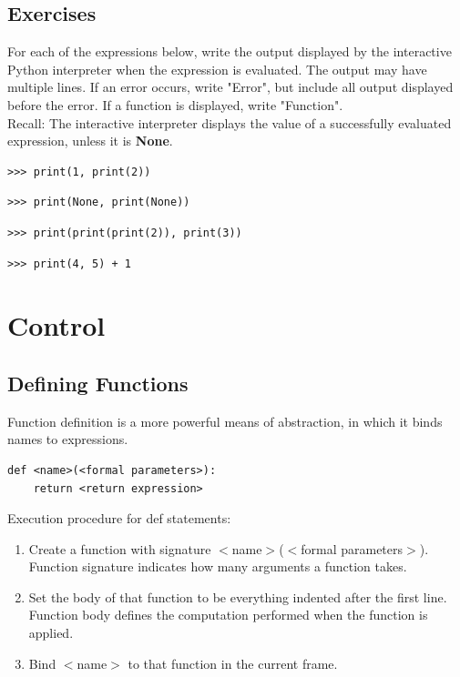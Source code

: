 \documentclass[11pt]{article}
\begin{document}
\subsection{Exercises}
For each of the expressions below, write the output displayed by the interactive Python interpreter when the expression is evaluated. The output may have multiple lines. If an error occurs, write "Error", but include all output displayed before the error. If a function is displayed, write "Function". \\
Recall: The interactive interpreter displays the value of a successfully evaluated expression, unless it is \textbf{None}. 
\begin{lstlisting}
>>> print(1, print(2))
\end{lstlisting}
\begin{lstlisting}
>>> print(None, print(None))
\end{lstlisting}
\begin{lstlisting}
>>> print(print(print(2)), print(3))
\end{lstlisting}
\begin{lstlisting}
>>> print(4, 5) + 1
\end{lstlisting}

\newpage
\section{Control}
\subsection{Defining Functions} 
Function definition is a more powerful means of abstraction, in which it binds names to expressions. 
\begin{lstlisting}
def <name>(<formal parameters>):
	return <return expression>
\end{lstlisting} 
Execution procedure for def statements: 
\begin{enumerate}
\item Create a function with signature $<$name$>$($<$formal parameters$>$). Function signature indicates how many arguments a function takes. 
\item Set the body of that function to be everything indented after the first line. Function body defines the computation performed when the function is applied. 
\item Bind $<$name$>$ to that function in the current frame. 
\end{enumerate} 
\end{document}
